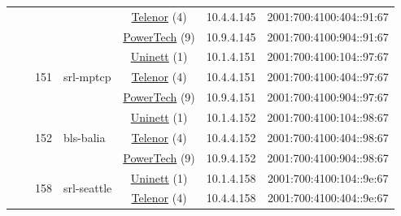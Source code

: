 \begin{small}
\begin{center}
\begin{longtable}{|c|c|c|c|c|c|c|c|}
  &  &  &  & \multicolumn{2}{|c|}{\tiny{\href{https://www.telenor.no}{Telenor} (4)}} & \tiny{10.4.4.145} & \tiny{2001:700:4100:404::91:67} \\* \cline{5-5}\cline{6-6}\cline{7-7}\cline{8-8}
  &  &  &  & \multicolumn{2}{|c|}{\tiny{\href{http://www.powertech.no}{PowerTech} (9)}} & \tiny{10.9.4.145} & \tiny{2001:700:4100:904::91:67} \\* \cline{3-3}\cline{4-4}\cline{5-5}\cline{6-6}\cline{7-7}\cline{8-8}
  &  & \multirow{3}{*}{\tiny{151}} & \multicolumn{1}{|l|}{\multirow{3}{*}{\tiny{srl-mptcp}}} & \multicolumn{2}{|c|}{\tiny{\href{https://www.uninett.no}{Uninett} (1)}} & \tiny{10.1.4.151} & \tiny{2001:700:4100:104::97:67} \\* \cline{5-5}\cline{6-6}\cline{7-7}\cline{8-8}
  &  &  &  & \multicolumn{2}{|c|}{\tiny{\href{https://www.telenor.no}{Telenor} (4)}} & \tiny{10.4.4.151} & \tiny{2001:700:4100:404::97:67} \\* \cline{5-5}\cline{6-6}\cline{7-7}\cline{8-8}
  &  &  &  & \multicolumn{2}{|c|}{\tiny{\href{http://www.powertech.no}{PowerTech} (9)}} & \tiny{10.9.4.151} & \tiny{2001:700:4100:904::97:67} \\* \cline{3-3}\cline{4-4}\cline{5-5}\cline{6-6}\cline{7-7}\cline{8-8}
  &  & \multirow{3}{*}{\tiny{152}} & \multicolumn{1}{|l|}{\multirow{3}{*}{\tiny{bls-balia}}} & \multicolumn{2}{|c|}{\tiny{\href{https://www.uninett.no}{Uninett} (1)}} & \tiny{10.1.4.152} & \tiny{2001:700:4100:104::98:67} \\* \cline{5-5}\cline{6-6}\cline{7-7}\cline{8-8}
  &  &  &  & \multicolumn{2}{|c|}{\tiny{\href{https://www.telenor.no}{Telenor} (4)}} & \tiny{10.4.4.152} & \tiny{2001:700:4100:404::98:67} \\* \cline{5-5}\cline{6-6}\cline{7-7}\cline{8-8}
  &  &  &  & \multicolumn{2}{|c|}{\tiny{\href{http://www.powertech.no}{PowerTech} (9)}} & \tiny{10.9.4.152} & \tiny{2001:700:4100:904::98:67} \\* \cline{3-3}\cline{4-4}\cline{5-5}\cline{6-6}\cline{7-7}\cline{8-8}
  &  & \multirow{3}{*}{\tiny{158}} & \multicolumn{1}{|l|}{\multirow{3}{*}{\tiny{srl-seattle}}} & \multicolumn{2}{|c|}{\tiny{\href{https://www.uninett.no}{Uninett} (1)}} & \tiny{10.1.4.158} & \tiny{2001:700:4100:104::9e:67} \\* \cline{5-5}\cline{6-6}\cline{7-7}\cline{8-8}
  &  &  &  & \multicolumn{2}{|c|}{\tiny{\href{https://www.telenor.no}{Telenor} (4)}} & \tiny{10.4.4.158} & \tiny{2001:700:4100:404::9e:67} \\* \cline{5-5}\cline{6-6}\cline{7-7}\cline{8-8}

\end{longtable}
\end{center}
\end{small}
